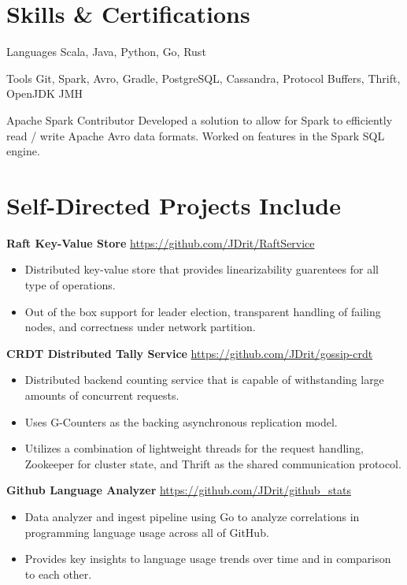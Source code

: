 \documentclass[a4paper,margin,line]{resume}
\newcommand{\rurl}[1]{\hfill {\footnotesize \url{#1}}}
\begin{document}
\begin{resume}
\section{\mysidestyle Skills \& Certifications}
  \begin{compactdesc}
  \item[Languages] \small Scala, Java, Python, Go, Rust
  \item[Tools] \small Git, Spark, Avro, Gradle, PostgreSQL, Cassandra, Protocol Buffers, Thrift,
    OpenJDK JMH
  \item[Apache Spark Contributor] Developed a solution to allow for Spark to efficiently read /
    write Apache Avro data formats. Worked on features in the Spark SQL engine.
  \end{compactdesc}
  \vspace{-2mm}
  \section{\mysidestyle Self-Directed Projects Include}
  \textbf{Raft Key-Value Store} \rurl{https://github.com/JDrit/RaftService}
  \begin{itemize}
    \item Distributed key-value store that provides linearizability guarentees for all type of
      operations.
    \item Out of the box support for leader election, transparent handling of failing nodes, and
      correctness under network partition.
  \end{itemize}
  \vspace{-2mm}
  \textbf{CRDT Distributed Tally Service} \rurl{https://github.com/JDrit/gossip-crdt}
  \begin{itemize}
    \item Distributed backend counting service that is capable of withstanding large amounts of
      concurrent requests.
    \item Uses G-Counters as the backing asynchronous replication model.
    \item Utilizes a combination of lightweight threads for the request handling, Zookeeper for
      cluster state, and Thrift as the shared communication protocol.
  \end{itemize}
  \vspace{-2mm}
  \textbf{Github Language Analyzer} \rurl{https://github.com/JDrit/github_stats}
  \begin{itemize}
    \item Data analyzer and ingest pipeline using Go to analyze correlations in programming language
      usage across all of GitHub.
    \item Provides key insights to language usage trends over time and in comparison to each other.
  \end{itemize}
\end{resume}
\end{document}
